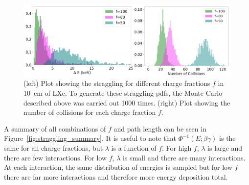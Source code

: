 \begin{figure}[htbp]
\begin{center}
\includegraphics[width=\textwidth]{figures/lips/straggling_xe_examples.png}
\caption{(left) Plot showing the straggling for different charge fractions $f$ in 10~cm of \acs{LXe}. To generate these straggling \acs{pdf}s, the Monte Carlo described above was carried out 1000 times. (right) Plot showing the number of collisions for each charge fraction $f$.  }
\label{fig:lip_straggling_examples}
\end{center}
\end{figure}

A summary of all combinations of $f$ and path length can be seen in Figure~\ref{fig:straggling_summary}. It is useful to note that $\Phi^{-1}(E; \beta \gamma)$ is the same for all charge fractions, but $\lambda$ is a function of $f$. For high $f$, $\lambda$ is large and there are few interactions. For low $f$, $\lambda$ is small and there are many interactions. At each interaction, the same distribution of energies is sampled but for low $f$ there are far more interactions and therefore more energy deposition total. 


